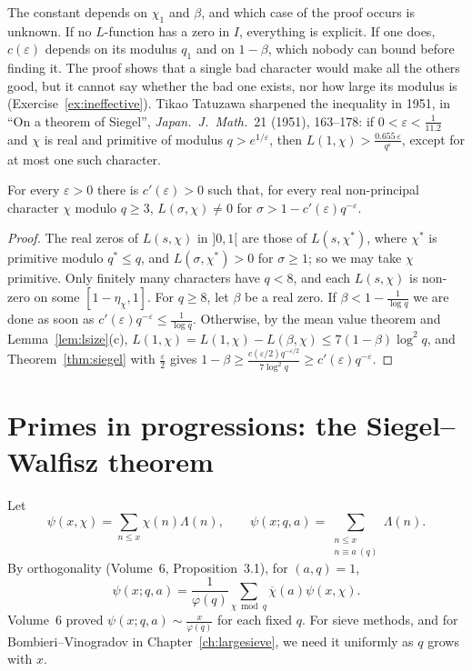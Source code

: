 The constant depends on $\chi_1$ and $\beta$, and which case of the proof occurs is unknown. If no $L$-function has a zero in $I$, everything is explicit. If one does, $c(\varepsilon)$ depends on its modulus $q_1$ and on $1-\beta$, which nobody can bound before finding it. The proof shows that a single bad character would make all the others good, but
it cannot say whether the bad one exists, nor how large its modulus is (Exercise~\ref{ex:ineffective}). Tikao Tatuzawa sharpened the inequality in 1951, in ``On a theorem of Siegel'', \emph{Japan.\ J.\ Math.}\ 21 (1951), 163--178: if $0<\varepsilon<\frac1{11.2}$ and $\chi$ is real and primitive of modulus $q>e^{1/\varepsilon}$, then $L(1,\chi)>\frac{0.655\,\varepsilon}{q^\varepsilon}$, except for at most one such character.

\begin{corollary}\label{cor:siegelzero}
For every $\varepsilon>0$ there is $c'(\varepsilon)>0$ such that, for every real non-principal character $\chi$ modulo $q\ge3$, $L(\sigma,\chi)\ne0$ for $\sigma>1-c'(\varepsilon)q^{-\varepsilon}$.
\end{corollary}
\begin{proof}
The real zeros of $L(s,\chi)$ in $]0,1[$ are those of $L(s,\chi^*)$, where $\chi^*$ is primitive modulo $q^*\le q$, and $L(\sigma,\chi^*)>0$ for $\sigma\ge1$; so we may take $\chi$ primitive. Only finitely many characters have $q<8$, and each $L(s,\chi)$ is non-zero on some $[1-\eta_\chi,1]$. For $q\ge8$, let $\beta$ be a real zero. If
$\beta<1-\frac1{\log q}$ we are done as soon as $c'(\varepsilon)q^{-\varepsilon}\le\frac1{\log q}$. Otherwise, by the mean value theorem and Lemma~\ref{lem:lsize}(c), $L(1,\chi)=L(1,\chi)-L(\beta,\chi)\le7(1-\beta)\log^2q$, and Theorem~\ref{thm:siegel} with $\frac\varepsilon2$ gives $1-\beta\ge\frac{c(\varepsilon/2)q^{-\varepsilon/2}}{7\log^2q}\ge c'(\varepsilon)q^{-\varepsilon}$.
\end{proof}

\section{Primes in progressions: the Siegel--Walfisz theorem}

Let
\[
\psi(x,\chi)=\sum_{n\le x}\chi(n)\Lambda(n),\qquad\psi(x;q,a)=\sum_{\substack{n\le x\\ n\equiv a\ (q)}}\Lambda(n).
\]
By orthogonality (Volume~6, Proposition~3.1), for $(a,q)=1$,
\begin{equation}\label{eq:orthpsi}
\psi(x;q,a)=\frac1{\varphi(q)}\sum_{\chi\bmod q}\overline\chi(a)\psi(x,\chi).
\end{equation}
Volume~6 proved $\psi(x;q,a)\sim\frac x{\varphi(q)}$ for each fixed $q$. For sieve methods, and for Bombieri--Vinogradov in Chapter~\ref{ch:largesieve}, we need it uniformly as $q$ grows with $x$.

